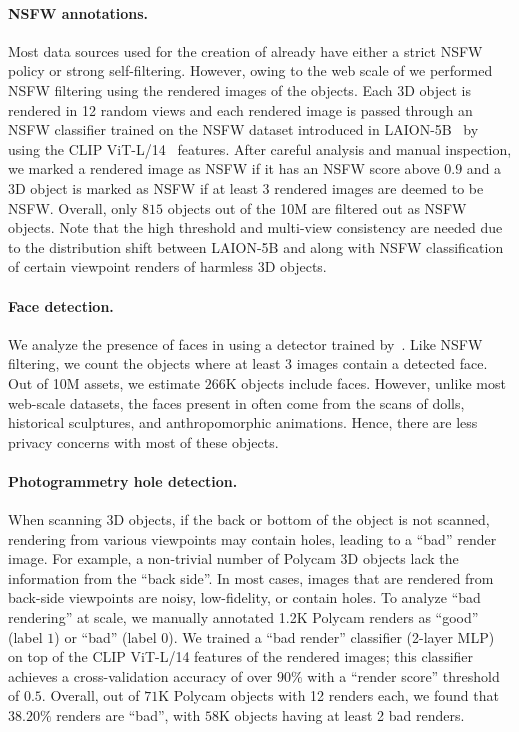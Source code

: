 \paragraph{NSFW annotations.} Most data sources used for the creation of \dataset already have either a strict NSFW policy or strong self-filtering. However, owing to the web scale of \dataset we performed NSFW filtering using the rendered images of the objects. Each 3D object is rendered in 12 random views and each rendered image is passed through an NSFW classifier trained on the NSFW dataset introduced in LAION-5B~\citep{schuhmann2022laion} by~\citet{gadre2023datacomp} using the CLIP ViT-L/14~\citep{radford2021learning} features. After careful analysis and manual inspection, we marked a rendered image as NSFW if it has an NSFW score above $0.9$ and a 3D object is marked as NSFW if at least $3$ rendered images are deemed to be NSFW. Overall, only $815$ objects out of the 10M are filtered out as NSFW objects. Note that the high threshold and multi-view consistency are needed due to the distribution shift between LAION-5B and \dataset along with NSFW classification of certain viewpoint renders of harmless 3D objects.

\paragraph{Face detection.} We analyze the presence of faces in \dataset using a detector trained by~\citet{gadre2023datacomp}. Like NSFW filtering, we count the objects where at least $3$ images contain a detected face. Out of 10M assets, we estimate $266$K objects include faces. However, unlike most web-scale datasets, the faces present in \dataset often come from the scans of dolls, historical sculptures, and anthropomorphic animations. Hence, there are less privacy concerns with most of these objects.

\paragraph{Photogrammetry hole detection.} When scanning 3D objects, if the back or bottom of the object is not scanned, rendering from various viewpoints may contain holes, leading to a ``bad'' render image. For example, a non-trivial number of Polycam 3D objects lack the information from the ``back side''. In most cases, images that are rendered from back-side viewpoints are noisy, low-fidelity, or contain holes. To analyze ``bad rendering'' at scale, we manually annotated 1.2K Polycam renders as ``good'' (label $1$) or ``bad'' (label $0$). We trained a ``bad render'' classifier (2-layer MLP) on top of the CLIP ViT-L/14 features of the rendered images; this classifier achieves a cross-validation accuracy of over $90\%$ with a ``render score'' threshold of $0.5$. Overall, out of $71$K Polycam objects with 12 renders each, we found that $38.20\%$ renders are ``bad'', with  $58$K objects having at least 2 bad renders.


